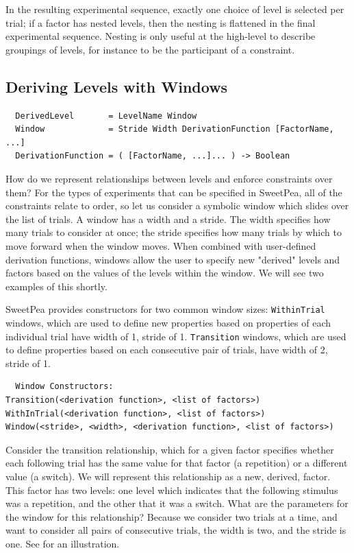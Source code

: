 In the resulting experimental sequence, exactly one choice of level is selected per trial; if a factor has nested levels, then the nesting is flattened in the final experimental sequence. Nesting is only useful at the high-level to describe groupings of levels, for instance to be the participant of a constraint.



\subsection{Deriving Levels with Windows}

\begin{verbatim}
  DerivedLevel       = LevelName Window
  Window             = Stride Width DerivationFunction [FactorName, ...]
  DerivationFunction = ( [FactorName, ...]... ) -> Boolean
\end{verbatim}

How do we represent relationships between levels and enforce constraints over them? For the types of experiments that can be specified in SweetPea, all of the constraints relate to order, so let us consider a symbolic window which slides over the list of trials. A window has a width and a stride. The width specifies how many trials to consider at once; the stride specifies how many trials by which to move forward when the window moves. When combined with user-defined derivation functions, windows allow the user to specify new "derived" levels and factors based on the values of the levels within the window. We will see two examples of this shortly.

SweetPea provides constructors for two common window sizes: \texttt{WithinTrial} windows, which are used to define new properties based on properties of each individual trial have width of 1, stride of 1. \texttt{Transition} windows, which are used to define properties based on each consecutive pair of trials, have width of 2, stride of 1.

\begin{verbatim}
  Window Constructors:
Transition(<derivation function>, <list of factors>)
WithInTrial(<derivation function>, <list of factors>)
Window(<stride>, <width>, <derivation function>, <list of factors>)
\end{verbatim}

Consider the transition relationship, which for a given factor specifies whether each following trial has the same value for that factor (a repetition) or a different value (a switch). We will represent this relationship as a new, derived, factor. This factor has two levels: one level which indicates that the following stimulus was a repetition, and the other that it was a switch. What are the parameters for the window for this relationship? Because we consider two trials at a time, and want to consider all pairs of consecutive trials, the width is two, and the stride is one. See  for an illustration.

